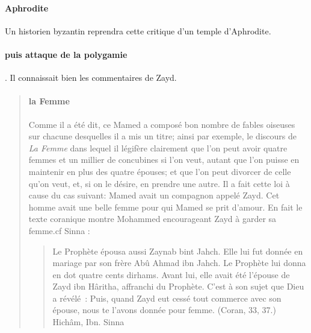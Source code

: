\paragraph{Aphrodite} Un historien byzantin reprendra cette critique d'un temple d'Aphrodite.

\paragraph{puis attaque de la polygamie}. 
Il connaissait bien les commentaires de Zayd. 

\begin{quote}
    

\paragraph{la Femme}
Comme il a été dit, ce Mamed a composé bon nombre de fables oiseuses sur chacune desquelles il a mis un titre; ainsi par exemple, le discours de \textit{La Femme} dans lequel il légifère clairement que l'on peut avoir quatre femmes et un millier de concubines si l'on veut, autant que l'on puisse en maintenir en plus des quatre épouses; et que l'on peut divorcer de celle qu'on veut, et, si on le désire, en prendre une autre. Il a fait cette loi à cause du cas suivant: Mamed avait un compagnon appelé Zayd. Cet homme avait une belle femme pour qui Mamed se prit d'amour. En fait le texte coranique montre Mohammed encourageant Zayd à
garder sa femme.cf Sinna : 
\begin{quote}
Le Prophète épousa aussi Zaynab bint Jahch. Elle lui fut donnée en mariage par son frère Abû Ahmad ibn Jahch. Le Prophète lui donna en dot quatre cents dirhams. Avant lui, elle avait été l'épouse de Zayd ibn Hâritha, affranchi du Prophète. C'est à son sujet que Dieu a révélé : Puis, quand Zayd eut cessé tout commerce avec son épouse, nous te l'avons donnée pour femme. (Coran, 33, 37.)
Hichâm, Ibn. Sinna 
\end{quote}


\end{quote}
